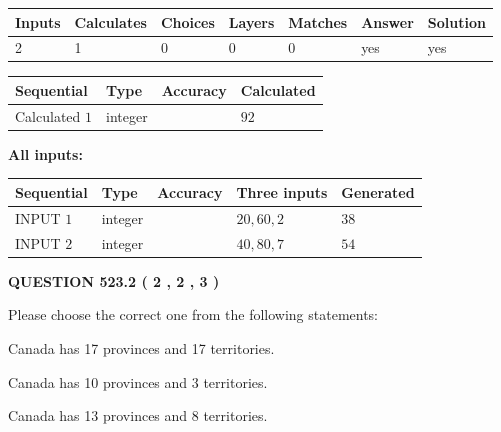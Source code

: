 \documentclass[12pt]{article}
\begin{document}
   
\noindent\begin{tabular}{|l|l|l|l|l|l|l|}
 \hline
Inputs & Calculates & Choices & Layers & Matches & Answer & Solution \\ \hline
 2  & 
 1  & 
 0
  & 
 0  & 
 0  & 
  yes & 
  yes 
  \\ \hline
 \end{tabular}
   
   
   
   
\noindent{}
   
   
  
  
\noindent\begin{tabular}{|l|l|l|l|}
\hline
 Sequential & Type & Accuracy & Calculated \\ 
\hline
 
 
  Calculated $  1 $ & integer &  & 
  $ 92 $ 
 \\  \hline  
 \end{tabular}
   
   
   
   
\noindent\vspace{0.1in}\hspace{-0.08in} {\textbf{\Large{All inputs: }}}
   
   
  
  
\noindent\begin{tabular}{|l|l|l|l|l|}
\hline
 Sequential & Type & Accuracy & Three inputs & Generated \\ 
\hline
 
 
  INPUT $  1 $ & integer &  & $
 20
 , 
 60
 , 
 2
 $ & $ 38 $ 
 \\  \hline  
 
 
  INPUT $  2 $ & integer &  & $
 40
 , 
 80
 , 
 7
 $ & $ 54 $ 
 \\  \hline  
 \end{tabular}
   
   
  
\vspace{0.2in}
  
{\textbf{\Large{QUESTION
523.2 
 ( 2 , 2 , 3 )
}}}
  
  
Please choose the correct one from the following statements:
 
 
Canada has  17 provinces and  17 territories.
 
 
Canada has 10  provinces and 3 territories.
 
 
Canada has  13 provinces and  8 territories.
 
\end{document}
